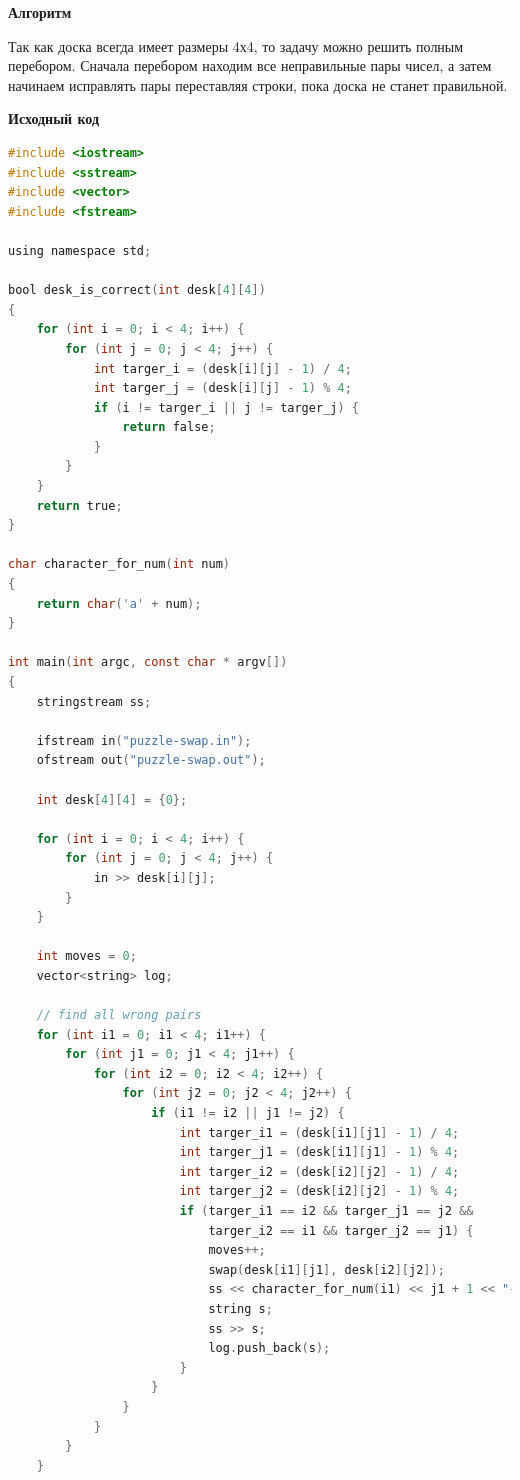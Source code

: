 \documentclass[a4paper,12pt]{article}
\begin{document}
\textbf{{\large Алгоритм}}

Так как доска всегда имеет размеры 4х4, то задачу можно решить полным перебором. Сначала перебором находим все неправильные пары чисел, а затем начинаем исправлять пары переставляя строки, пока доска не станет правильной.

\newpage
\textbf{{\large Исходный код}} \\
\begin{lstlisting}[language=C]
#include <iostream>
#include <sstream>
#include <vector>
#include <fstream>

using namespace std;

bool desk_is_correct(int desk[4][4])
{
    for (int i = 0; i < 4; i++) {
        for (int j = 0; j < 4; j++) {
            int targer_i = (desk[i][j] - 1) / 4;
            int targer_j = (desk[i][j] - 1) % 4;
            if (i != targer_i || j != targer_j) {
                return false;
            }
        }
    }
    return true;
}

char character_for_num(int num)
{
    return char('a' + num);
}

int main(int argc, const char * argv[])
{
    stringstream ss;
    
    ifstream in("puzzle-swap.in");
    ofstream out("puzzle-swap.out");
    
    int desk[4][4] = {0};
    
    for (int i = 0; i < 4; i++) {
        for (int j = 0; j < 4; j++) {
            in >> desk[i][j];
        }
    }
    
    int moves = 0;
    vector<string> log;
    
    // find all wrong pairs
    for (int i1 = 0; i1 < 4; i1++) {
        for (int j1 = 0; j1 < 4; j1++) {
            for (int i2 = 0; i2 < 4; i2++) {
                for (int j2 = 0; j2 < 4; j2++) {
                    if (i1 != i2 || j1 != j2) {
                        int targer_i1 = (desk[i1][j1] - 1) / 4;
                        int targer_j1 = (desk[i1][j1] - 1) % 4;
                        int targer_i2 = (desk[i2][j2] - 1) / 4;
                        int targer_j2 = (desk[i2][j2] - 1) % 4;
                        if (targer_i1 == i2 && targer_j1 == j2 &&
                            targer_i2 == i1 && targer_j2 == j1) {
                            moves++;
                            swap(desk[i1][j1], desk[i2][j2]);
                            ss << character_for_num(i1) << j1 + 1 << "-" << character_for_num(i2) << j2 + 1 << endl;
                            string s;
                            ss >> s;
                            log.push_back(s);
                        }
                    }
                }
            }
        }
    }
    

\end{lstlisting}
\end{document}
